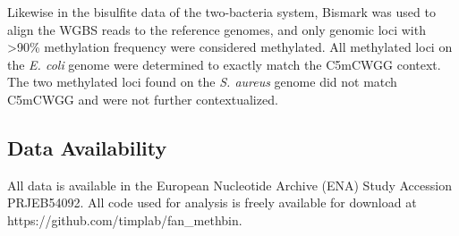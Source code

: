 Likewise in the bisulfite data of the two-bacteria system, Bismark was used to align the WGBS reads to the reference genomes, and only genomic loci with >90\% methylation frequency were considered methylated. All methylated loci on the \textit{E. coli} genome were determined to exactly match the C5mCWGG context. The two methylated loci found on the \textit{S. aureus} genome did not match C5mCWGG and were not further contextualized.

\subsection{Data Availability}
\label{sec:methods}

All data is available in the European Nucleotide Archive (ENA) Study Accession PRJEB54092. All code used for analysis is freely available for download at https://github.com/timplab/fan\_methbin.
